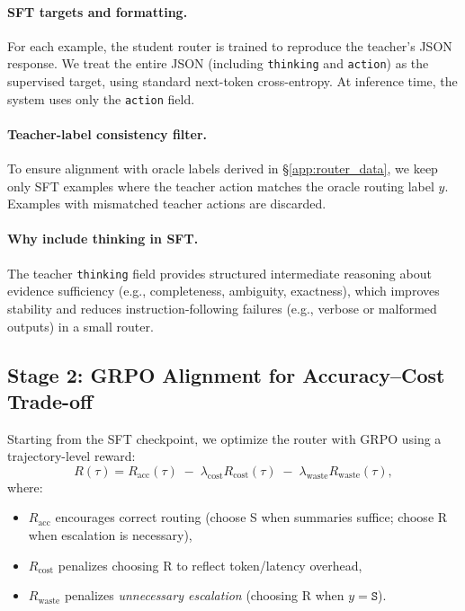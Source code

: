 \documentclass{article}
\theoremstyle{plain}
\theoremstyle{definition}
\theoremstyle{remark}
\begin{document}
\paragraph{SFT targets and formatting.}
For each example, the student router is trained to reproduce the teacher's JSON response.
We treat the entire JSON (including \texttt{thinking} and \texttt{action}) as the supervised target, using standard next-token cross-entropy.
At inference time, the system uses only the \texttt{action} field.

\paragraph{Teacher-label consistency filter.}
To ensure alignment with oracle labels derived in \S\ref{app:router_data}, we keep only SFT examples where the teacher action matches the oracle routing label $y$.
Examples with mismatched teacher actions are discarded.

\paragraph{Why include thinking in SFT.}
The teacher \texttt{thinking} field provides structured intermediate reasoning about evidence sufficiency (e.g., completeness, ambiguity, exactness), which improves stability and reduces instruction-following failures (e.g., verbose or malformed outputs) in a small router.

\subsection{Stage 2: GRPO Alignment for Accuracy--Cost Trade-off}
\label{app:router_grpo}

Starting from the SFT checkpoint, we optimize the router with GRPO using a trajectory-level reward:
\begin{equation}
R(\tau) = R_{\mathrm{acc}}(\tau)\;-\;\lambda_{\mathrm{cost}} R_{\mathrm{cost}}(\tau)\;-\;\lambda_{\mathrm{waste}} R_{\mathrm{waste}}(\tau),
\label{eq:app_router_reward}
\end{equation}
where:
\begin{itemize}
  \item $R_{\mathrm{acc}}$ encourages correct routing (choose S when summaries suffice; choose R when escalation is necessary),
  \item $R_{\mathrm{cost}}$ penalizes choosing R to reflect token/latency overhead,
  \item $R_{\mathrm{waste}}$ penalizes \emph{unnecessary escalation} (choosing R when $y=\texttt{S}$).
\end{itemize}
\end{document}
